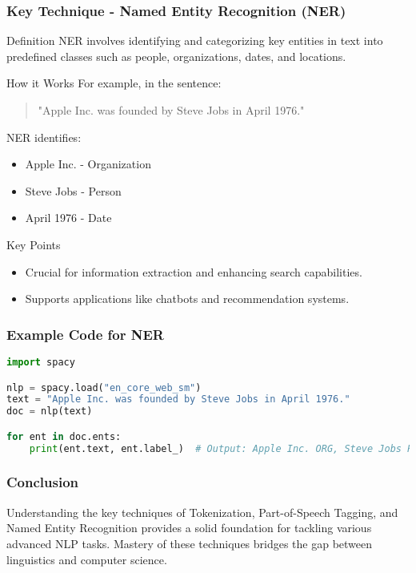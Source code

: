 \documentclass[aspectratio=169]{beamer}
\begin{document}
\begin{frame}[fragile]
    \frametitle{Key Technique - Named Entity Recognition (NER)}
    \begin{block}{Definition}
        NER involves identifying and categorizing key entities in text into predefined classes such as people, organizations, dates, and locations.
    \end{block}

    \begin{block}{How it Works}
        For example, in the sentence:
        \begin{quote}
            "Apple Inc. was founded by Steve Jobs in April 1976."
        \end{quote}
        NER identifies:
        \begin{itemize}
            \item Apple Inc. - Organization
            \item Steve Jobs - Person
            \item April 1976 - Date
        \end{itemize}
    \end{block}

    \begin{block}{Key Points}
        \begin{itemize}
            \item Crucial for information extraction and enhancing search capabilities.
            \item Supports applications like chatbots and recommendation systems.
        \end{itemize}
    \end{block}
\end{frame}

\begin{frame}[fragile]
    \frametitle{Example Code for NER}
    \begin{lstlisting}[language=Python]
import spacy

nlp = spacy.load("en_core_web_sm")
text = "Apple Inc. was founded by Steve Jobs in April 1976."
doc = nlp(text)

for ent in doc.ents:
    print(ent.text, ent.label_)  # Output: Apple Inc. ORG, Steve Jobs PERSON, April 1976 DATE
    \end{lstlisting}
\end{frame}

\begin{frame}[fragile]
    \frametitle{Conclusion}
    Understanding the key techniques of Tokenization, Part-of-Speech Tagging, and Named Entity Recognition provides a solid foundation for tackling various advanced NLP tasks. Mastery of these techniques bridges the gap between linguistics and computer science.
\end{frame}
\end{document}
